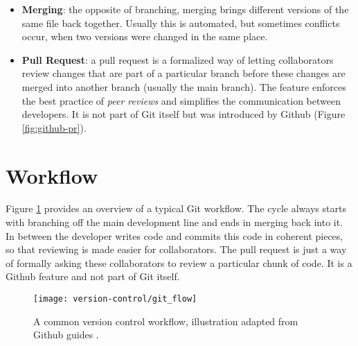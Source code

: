 \begin{itemize}
  \item \textbf{Merging}: the opposite of branching, merging brings different versions of the same file back together. Usually this is automated, but sometimes conflicts occur, when two versions were changed in the same place.
  \item \textbf{Pull Request}: a pull request is a formalized way of letting collaborators review changes that are part of a particular branch before these changes are merged into another branch (usually the main branch). The feature enforces the best practice of \textit{peer reviews} and simplifies the communication between developers. It is not part of Git itself but was introduced by Github (Figure \ref{fig:github-pr}).
\end{itemize}

\section{Workflow}
Figure \ref{fig:git-workflow} provides an overview of a typical Git workflow. The cycle always starts with branching off the main development line and ends in merging back into it. In between the developer writes code and commits this code in coherent pieces, so that reviewing is made easier for collaborators. The pull request is just a way of formally asking these collaborators to review a particular chunk of code. It is a Github feature and not part of Git itself.


\begin{figure}[h]
 \centering
 \texttt{[image: version-control/git\_flow]}
 \caption{A common version control workflow, illustration adapted from Github guides \cite{_understanding_????}.}
 \label{fig:git-workflow}
\end{figure}


